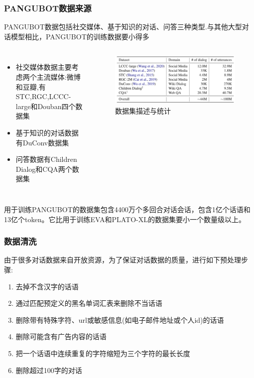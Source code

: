 \documentclass{beamer}
\begin{document}
\begin{frame}
    \frametitle{PANGUBOT数据来源}

    PANGUBOT数据包括社交媒体、基于知识的对话、问答三种类型.与其他大型对话模型相比，PANGUBOT的训练数据要小得多

    \begin{columns}
        \begin{itemize}
            \item 社交媒体数据主要考虑两个主流媒体:微博和豆瓣,有STC,RGC,LCCC-large和Douban四个数据集
            \item 基于知识的对话数据有DuConv数据集
            \item 问答数据有Children Dialog和CQA两个数据集
        \end{itemize}

        \begin{figure}
            \centering
            \includegraphics[width=1.0\textwidth]{fig/data.png}
            \caption{数据集描述与统计}
        \end{figure}

    \end{columns}

    用于训练PANGUBOT的数据集包含4400万个多回合对话会话，包含1亿个话语和13亿个token。它比用于训练EVA和PLATO-XL的数据集要小一个数量级以上。
\end{frame}

\begin{frame}
    \frametitle{数据清洗}

    由于很多对话数据来自开放资源，为了保证对话数据的质量，进行如下预处理步骤:
    \begin{enumerate}
        \item 去掉不含汉字的话语
        \item 通过匹配预定义的黑名单词汇表来删除不当话语
        \item 删除带有特殊字符、url或敏感信息(如电子邮件地址或个人id)的话语
        \item 删除可能含有广告内容的话语
        \item 把一个话语中连续重复的字符缩短为三个字符的最长长度
        \item 删除超过100字的对话
    \end{enumerate}
\end{frame}
\end{document}
